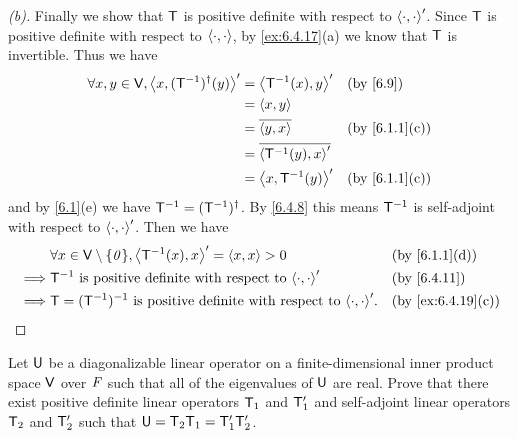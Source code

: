 \begin{proof}[(b)]
  Finally we show that \(\mathsf{T}\) is positive definite with respect to \(\left\langle\cdot, \cdot\right\rangle'\).
  Since \(\mathsf{T}\) is positive definite with respect to \(\left\langle\cdot, \cdot\right\rangle\), by \cref{ex:6.4.17}(a) we know that \(\mathsf{T}\) is invertible.
  Thus we have
  \begin{align*}
    \forall x, y \in \V, \inn{x, (\T^{-1})^{\dag}(y)}' & = \inn{\T^{-1}(x), y}'        &  & \text{(by \cref{6.9})}      \\
                                                       & = \inn{x, y}                                                   \\
                                                       & = \conj{\inn{y, x}}           &  & \text{(by \cref{6.1.1}(c))} \\
                                                       & = \conj{\inn{\T^{-1}(y), x}'}                                  \\
                                                       & = \inn{x, \T^{-1}(y)}'        &  & \text{(by \cref{6.1.1}(c))}
  \end{align*}
  and by \cref{6.1}(e) we have \(\mathsf{T}^{-1} = (\mathsf{T}^{-1})^{\dag}\).
  By \cref{6.4.8} this means \(\mathsf{T}^{-1}\) is self-adjoint with respect to \(\left\langle\cdot, \cdot\right\rangle'\).
  Then we have
  \begin{align*}
             & \forall x \in \V \setminus \set{\zv}, \inn{\T^{-1}(x), x}' = \inn{x, x} > 0            &  & \text{(by \cref{6.1.1}(d))}     \\
    \implies & \T^{-1} \text{ is positive definite with respect to } \inn{\cdot, \cdot}'              &  & \text{(by \cref{6.4.11})}       \\
    \implies & \T = (\T^{-1})^{-1} \text{ is positive definite with respect to } \inn{\cdot, \cdot}'. &  & \text{(by \cref{ex:6.4.19}(c))}
  \end{align*}
\end{proof}

\begin{ex}\label{ex:6.4.23}
  Let \(\mathsf{U}\) be a diagonalizable linear operator on a finite-dimensional inner product space \(\mathsf{V}\) over \(\mathit{F}\) such that all of the eigenvalues of \(\mathsf{U}\) are real.
  Prove that there exist positive definite linear operators \(\mathsf{T}_1\) and \(\mathsf{T}_1'\) and self-adjoint linear operators \(\mathsf{T}_2\) and \(\mathsf{T}_2'\) such that \(\mathsf{U} = \mathsf{T}_2 \mathsf{T}_1 = \mathsf{T}_1' \mathsf{T}_2'\).
\end{ex}

